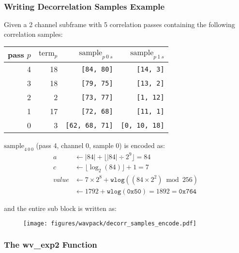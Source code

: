 {\subsubsection{Writing Decorrelation Samples Example}
Given a 2 channel subframe with 5 correlation passes containing
the following correlation samples:
\begin{table}[h]
\begin{tabular}{rrrr}
pass $p$ & $\text{term}_p$ & $\text{sample}_{p~0~s}$ & $\text{sample}_{p~1~s}$ \\
\hline
4 & 18 & \texttt{[84, 80]} & \texttt{[14, 3]} \\
3 & 18 & \texttt{[79, 75]} & \texttt{[13, 2]} \\
2 & 2 & \texttt{[73, 77]} & \texttt{[1, 12]} \\
1 & 17 & \texttt{[72, 68]} & \texttt{[11, 1]} \\
0 & 3 & \texttt{[62, 68, 71]} & \texttt{[0, 10, 18]} \\
\end{tabular}
\end{table}
\par
\noindent
$\text{sample}_{4~0~0}$ (pass 4, channel 0, sample 0) is encoded as:
\begin{align*}
a &\leftarrow |84| + \lfloor|84| \div 2 ^ 9\rfloor = 84 \\
c &\leftarrow \lfloor\log_2(84)\rfloor + 1 = 7 \\
value &\leftarrow 7 \times 2 ^ 8 + \texttt{wlog}((84 \times 2 ^ 2) \bmod 256) \\
&\leftarrow 1792 + \texttt{wlog}(\texttt{0x50}) = 1892 = \texttt{0x764}
\end{align*}
\par
\noindent
and the entire sub block is written as:
\begin{figure}[h]
\texttt{[image: figures/wavpack/decorr\_samples\_encode.pdf]}
\end{figure}

\clearpage

\subsubsection{The wv\_exp2 Function}

}
